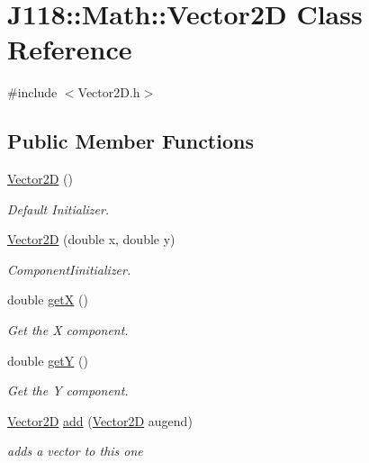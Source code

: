 \hypertarget{class_j118_1_1_math_1_1_vector2_d}{}\section{J118\+:\+:Math\+:\+:Vector2\+D Class Reference}
\label{class_j118_1_1_math_1_1_vector2_d}


{\ttfamily \#include $<$Vector2\+D.\+h$>$}

\subsection*{Public Member Functions}
\begin{DoxyCompactItemize}
\item 
\hyperlink{class_j118_1_1_math_1_1_vector2_d_afb5cccf703cc5fb06c48a7a947acb5f3}{Vector2\+D} ()
\begin{DoxyCompactList}\small\item\em Default Initializer. \end{DoxyCompactList}\item 
\hyperlink{class_j118_1_1_math_1_1_vector2_d_abe69953859a6ca6a065547567276ad3c}{Vector2\+D} (double x, double y)
\begin{DoxyCompactList}\small\item\em Component\+Iinitializer. \end{DoxyCompactList}\item 
double \hyperlink{class_j118_1_1_math_1_1_vector2_d_aaf6a3aac74ce510a72364b7a2c7b1e93}{get\+X} ()
\begin{DoxyCompactList}\small\item\em Get the X component. \end{DoxyCompactList}\item 
double \hyperlink{class_j118_1_1_math_1_1_vector2_d_a20386c667a551511e94c955599f80fb4}{get\+Y} ()
\begin{DoxyCompactList}\small\item\em Get the Y component. \end{DoxyCompactList}\item 
\hyperlink{class_j118_1_1_math_1_1_vector2_d}{Vector2\+D} \hyperlink{class_j118_1_1_math_1_1_vector2_d_a73901f493ce70714e82b469c9913bbe0}{add} (\hyperlink{class_j118_1_1_math_1_1_vector2_d}{Vector2\+D} augend)
\begin{DoxyCompactList}\small\item\em adds a vector to this one \end{DoxyCompactList}\item 

\end{DoxyCompactItemize}
